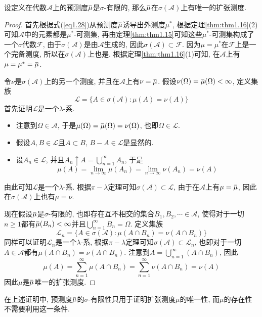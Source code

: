 \documentclass[cn, 12pt, math=mtpro2, bibstyle=apa, blue, twocol]{elegantbook}
\newcommand{\F}{\mathcal{F}}
\newcommand{\limn}{\lim_{n\to\infty}}
\newcommand{\overbar}[1]{\mkern 1.5mu\overline{\mkern-1.5mu#1\mkern-1.5mu}\mkern 1.5mu}
\begin{document}
\begin{theorem}[Carathéodory扩张定理]
  设定义在代数$\mathcal{A}$上的预测度$\overbar{\mu}$是$\sigma$-有限的, 那么$\overbar{\mu}$在$\sigma(\mathcal{A})$上有唯一的扩张测度.
\end{theorem}
\begin{proof}
  首先根据式(\ref{eq1.28})从预测度$\overbar{\mu}$诱导出外测度$\mu^\ast$, 根据定理\ref{thm:thm1.16}(2)可知$\mathcal{A}$中的元素都是$\mu^\ast$-可测集, 再由定理\ref{thm:thm1.15}可知这些$\mu^\ast$-可测集构成了一个$\sigma$代数$\F$, 由于$\sigma(\mathcal{A})$是由$\mathcal{A}$生成的, 因此$\sigma(\mathcal{A})\subset\F$. 因为$\mu=\mu^\ast$在$\F$上是一个完备测度, 所以在$\sigma(\mathcal{A})$上也是. 根据定理\ref{thm:thm1.16}(1)可知, 在$\mathcal{A}$上有$\mu=\mu^\ast=\overbar{\mu}$.

  令$\nu$是$\sigma(\mathcal{A})$上的另一个测度, 并且在$\mathcal{A}$上有$\nu=\overbar{\mu}$. 假设$\nu(\Omega)=\overbar{\mu}(\Omega)<\infty$, 定义集族
  $$\mathcal{L}=\{A\in\sigma(\mathcal{A}): \mu(A)=\nu(A)\}$$
  首先证明$\mathcal{L}$是一个$\lambda$-系.

  \begin{itemize}
    \item 注意到$\Omega\in\mathcal{A}$, 于是$\mu(\Omega)=\overbar{\mu}(\Omega)=\nu(\Omega)$, 也即$\Omega\in\mathcal{L}$.
    \item 假设$A, B\in\mathcal{L}$且$A\subset B$, $B-A\in\mathcal{L}$是显然的.
    \item 设$A_n\in\mathcal{L}$, 并且$A_n\uparrow A=\bigcup_{n=1}^\infty A_n$, 于是
    $$\mu(A)=\limn \mu(A_n)=\limn \nu(A_n)=\nu(A)$$
   \end{itemize}
   由此可知$\mathcal{L}$是一个$\lambda$-系. 根据$\pi-\lambda$定理可知$\sigma(\mathcal{A})\subset \mathcal{L}$, 由于在$\mathcal{A}$上有$\mu=\overbar{\mu}$, 因此在$\sigma(\mathcal{A})$上也有$\mu=\nu$.

   现在假设$\overbar{\mu}$是$\sigma$-有限的, 也即存在互不相交的集合$B_1,B_2,\cdots\in\mathcal{A}$, 使得对于一切$n\geq1$都有$\overbar{\mu}(B_n)<\infty$并且$\bigcup_{n=1}^\infty B_n=\Omega$. 定义集族
   $$\mathcal{L}_n=\{A\in\sigma(\mathcal{A}): \mu(A\cap B_n)=\nu(A\cap B_n)\}$$
   同样可以证明$\mathcal{L}_n$是一个$\lambda$-系, 根据$\pi-\lambda$定理可知$\sigma(\mathcal{A})\subset\mathcal{L}_n$, 也即对于一切$A\in\mathcal{A}$都有$\mu(A\cap B_n)=\nu(A\cap B_n)$. 注意到$A=\bigcup_{n=1}^\infty (A\cap B_n)$, 因此
   $$\mu(A)=\sum_{n=1}^{\infty}\mu(A\cap B_n)=\sum_{n=1}^{\infty}\nu(A\cap B_n)=\nu(A)$$
   因此$\mu$是$\overbar{\mu}$唯一的扩张测度.

\end{proof}
\begin{remark}
 在上述证明中, 预测度$\overbar{\mu}$的$\sigma$-有限性只用于证明扩张测度$\mu$的唯一性, 而$\mu$的存在性不需要利用这一条件.
\end{remark}
\end{document}
